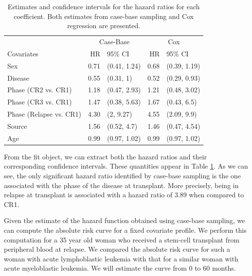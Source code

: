 \documentclass[
]{jss}
\begin{document}
\begin{CodeChunk}
\begin{table}

\caption{\label{tab:bmtcrr-cis}Estimates and confidence intervals for the hazard ratios for each coefficient. Both estimates from case-base sampling and Cox regression are presented.}
\centering
\begin{tabular}[t]{lrlrl}
\toprule
\multicolumn{1}{c}{ } & \multicolumn{2}{c}{Case-Base} & \multicolumn{2}{c}{Cox} \\
\cmidrule(l{3pt}r{3pt}){2-3} \cmidrule(l{3pt}r{3pt}){4-5}
Covariates & HR & 95\% CI & HR & 95\% CI\\
\midrule
Sex & 0.71 & (0.41, 1.24) & 0.68 & (0.39, 1.19)\\
Disease & 0.55 & (0.31, 1) & 0.52 & (0.29, 0.93)\\
Phase (CR2 vs. CR1) & 1.18 & (0.47, 2.93) & 1.21 & (0.48, 3.02)\\
Phase (CR3 vs. CR1) & 1.47 & (0.38, 5.63) & 1.67 & (0.43, 6.5)\\
Phase (Relapse vs. CR1) & 4.30 & (2, 9.27) & 4.55 & (2.09, 9.9)\\
\addlinespace
Source & 1.56 & (0.52, 4.7) & 1.46 & (0.47, 4.54)\\
Age & 0.99 & (0.97, 1.02) & 0.99 & (0.97, 1.02)\\
\bottomrule
\end{tabular}
\end{table}

\end{CodeChunk}

From the fit object, we can extract both the hazard ratios and their
corresponding confidence intervals. These quantities appear in Table
\ref{tab:bmtcrr-cis}. As we can see, the only significant hazard ratio
identified by case-base sampling is the one associated with the phase of
the disease at transplant. More precisely, being in relapse at
transplant is associated with a hazard ratio of 3.89 when compared to
CR1.

Given the estimate of the hazard function obtained using case-base
sampling, we can compute the absolute risk curve for a fixed covariate
profile. We perform this computation for a 35 year old woman who
received a stem-cell transplant from peripheral blood at relapse. We
compared the absolute risk curve for such a woman with acute
lymphoblastic leukemia with that for a similar woman with acute
myeloblastic leukemia. We will estimate the curve from 0 to 60 months.
\end{document}

